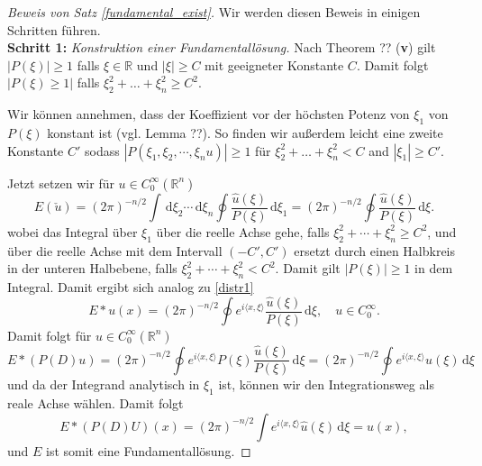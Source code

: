 \begin{proof}[Beweis von Satz \ref{fundamental_exist}]
Wir werden diesen Beweis in einigen Schritten führen.
\vspace{1mm}\\
\textbf{Schritt 1:} \emph{Konstruktion einer Fundamentallösung.}
Nach Theorem ?? ({\bf v}) gilt $|P(\xi)|\ge 1$ falls $\xi\in \mathbb R$ und $|\xi|\ge C$ mit geeigneter Konstante $C$.  Damit folgt $|P(\xi)\ge 1|$ falls $\xi_2^2+ \ldots + \xi_n^2 \ge C^2$.  

Wir können annehmen, dass der Koeffizient vor der höchsten Potenz von $\xi_1$ von $P(\xi)$ konstant ist (vgl. Lemma ??). 
So finden wir außerdem leicht eine zweite Konstante $C'$ sodass $|P(\xi_1, \xi_2, \cdots, \xi_nu)|\ge 1$ für $\xi_2^2+\ldots + \xi_n^2< C$ and $|\xi_1|\ge C'$.  

Jetzt setzen wir für $u\in C_0^\infty(\mathbb R^n)$
\begin{equation}\label{distr3}
E(\check u) = (2\pi)^{-n/2} \int \, \mathrm d\xi_2 \cdots \, \mathrm d\xi_n \oint \frac{\hat u(\xi)}{P(\xi)} \, \mathrm d\xi_1= (2\pi)^{-n/2} \oint \frac{\hat u(\xi)}{P(\xi)} \, \mathrm d\xi.
\end{equation}
wobei das Integral über $\xi_1$ über die reelle Achse gehe, falls $\xi_2^2+ \cdots + \xi_n^2 \ge C^2$, und über die reelle Achse mit dem Intervall $(-C', C')$ ersetzt durch einen Halbkreis in der unteren Halbebene, falls $\xi_2^2+ \cdots+ \xi_n^2 < C^2$. Damit gilt $|P(\xi)|\ge 1$  in dem Integral.  Damit ergibt sich analog zu \eqref{distr1}
\begin{equation}
E*u(x) = (2\pi)^{-n/2}\oint e^{i\langle x, \xi \rangle} \frac{\hat u(\xi)}{P(\xi)}\, \mathrm d\xi, \quad u \in C_0^\infty.
\end{equation} 
Damit folgt für $u\in C_0^\infty(\mathbb R^n)$
\begin{equation}
E*(P(D)u) = (2\pi)^{-n/2} \oint e^{i\langle x,\xi\rangle} P(\xi)  \frac{\hat{u} (\xi)}{P(\xi)}\, \mathrm d\xi=(2\pi)^{-n/2} \oint e^{i\langle x,\xi\rangle} \hat u(\xi) \, \mathrm d\xi
\end{equation}
und da der Integrand analytisch in $\xi_1$ ist, können wir den Integrationsweg als reale Achse wählen. Damit folgt
\begin{equation}
E*(P(D) U)(x) = (2\pi)^{-n/2} \int e^{i\langle x, \xi\rangle} \hat u(\xi) \, \mathrm d\xi = u(x),
\end{equation}
und $E$ ist somit eine Fundamentallösung.


\end{proof}

